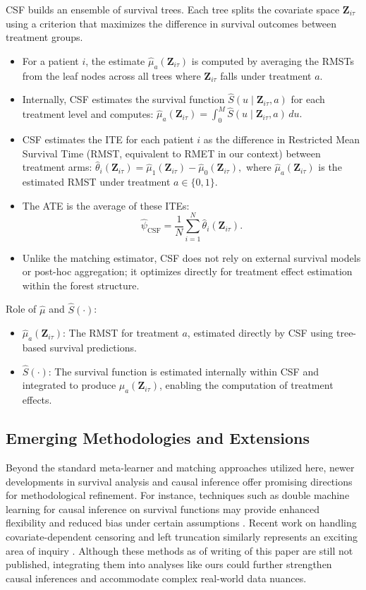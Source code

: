 CSF builds an ensemble of survival trees. Each tree splits the covariate space $ \mathbf{Z}_{i\tau} $ using a criterion that maximizes the difference in survival outcomes between treatment groups.
\begin{itemize}
\item For a patient $ i $, the estimate $ \widehat{\mu}_a(\mathbf{Z}_{i\tau}) $ is computed by averaging the RMSTs from the leaf nodes across all trees where $ \mathbf{Z}_{i\tau} $ falls under treatment $ a $.
\item Internally, CSF estimates the survival function $ \widehat{S}(u \mid \mathbf{Z}_{i\tau}, a) $ for each treatment level and computes:
  $ \widehat{\mu}_a(\mathbf{Z}_{i\tau}) = \int_{0}^{M} \widehat{S}(u \mid \mathbf{Z}_{i\tau}, a) \, du. $
\item CSF estimates the ITE for each patient $ i $ as the difference in Restricted Mean Survival Time (RMST, equivalent to RMET in our context) between treatment arms:
  $ \widehat{\theta}_{i}(\mathbf{Z}_{i\tau}) = \widehat{\mu}_1(\mathbf{Z}_{i\tau}) - \widehat{\mu}_0(\mathbf{Z}_{i\tau}), $
  where $ \widehat{\mu}_a(\mathbf{Z}_{i\tau}) $ is the estimated RMST under treatment $ a \in \{0, 1\} $.
\item The ATE is the average of these ITEs:
  \[ \widehat{\psi}_{\text{CSF}} = \frac{1}{N} \sum_{i=1}^{N} \widehat{\theta}_{i}(\mathbf{Z}_{i\tau}). \]
\item Unlike the matching estimator, CSF does not rely on external survival models or post-hoc aggregation; it optimizes directly for treatment effect estimation within the forest structure.
\end{itemize}

Role of $ \widehat{\mu} $ and $ \widehat{S}(\cdot) $:
\begin{itemize}
\item $ \widehat{\mu}_a(\mathbf{Z}_{i\tau}) $: The RMST for treatment $ a $, estimated directly by CSF using tree-based survival predictions.
\item $ \widehat{S}(\cdot) $: The survival function is estimated internally within CSF and integrated to produce $ \widehat{\mu}_a(\mathbf{Z}_{i\tau}) $, enabling the computation of treatment effects.
\end{itemize}


\subsection{Emerging Methodologies and Extensions}
\label{apd:in_context_of_new_research}
Beyond the standard meta-learner and matching approaches utilized here, newer developments in survival analysis and causal inference offer promising directions for methodological refinement.
For instance, techniques such as double machine learning for causal inference on survival functions may provide enhanced flexibility and reduced bias under certain assumptions \citep{kabata4875226double}.
Recent work on handling covariate-dependent censoring and left truncation similarly represents an exciting area of inquiry \citep{wang2024learning}.
Although these methods as of writing of this paper are still not published, integrating them into analyses like ours could further strengthen causal inferences and accommodate complex real-world data nuances.
